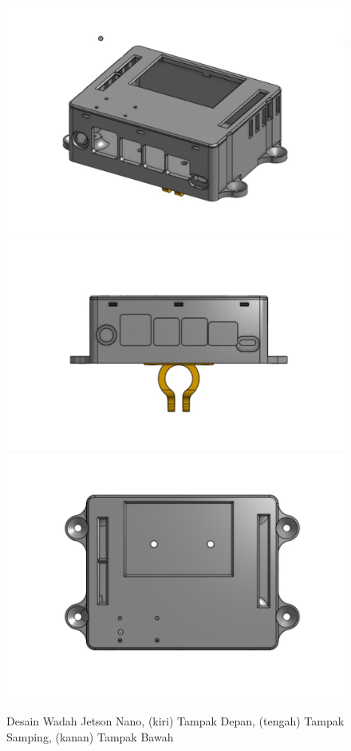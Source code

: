 \begin{figure}
  \centering

  \includegraphics[scale=0.13]{gambar/bab3-tampak-depan-case-jnano.jpeg}
  \includegraphics[scale=0.13]{gambar/bab3-tampak-samping-case-jnano.jpeg}
  \includegraphics[scale=0.13]{gambar/bab3-tampak-bawah-case-jnano.jpeg}

  \caption{\centering Desain Wadah Jetson Nano, (kiri) Tampak Depan, (tengah) Tampak Samping, (kanan) Tampak Bawah}
  \label{fig:designcontainerjetson}
\end{figure}

